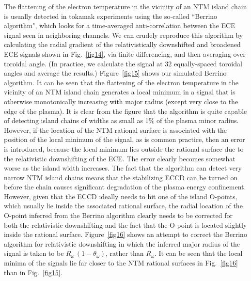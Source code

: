 \documentclass[12pt,prb,aps]{revtex4-1}
\begin{document}
The flattening of the electron temperature in the vicinity of an NTM island chain is usually detected in tokamak experiments using the so-called ``Berrino algorithm", which looks for
a time-averaged anti-correlation between the ECE signal seen in neighboring channels.\cite{ece4}  We can crudely reproduce this algorithm  by calculating the radial gradient of
the relativistically downshifted and broadened ECE signals shown in Fig.~\ref{fig14}, via finite differencing,  and then averaging over toroidal angle. (In practice, we
calculate the signal at 32 equally-spaced toroidal angles and average the results.) Figure~\ref{fig15} shows our simulated Berrino algorithm. It can be seen that the
flattening of the electron temperature in the vicinity of an NTM island chain generates a local minimum in a signal that is otherwise monotonically increasing with major radius (except very close to
the edge of the plasma). It is clear from the figure that the algorithm is quite capable of detecting island chains of widths as small as 1\% of the plasma minor radius. 
However, if the location of the NTM rational surface is associated with the position of the local minimum of the signal, as is common practice,\cite{ece4}  then an error is introduced, because the
local minimum lies outside the rational surface due to the relativistic downshifting of the ECE.  The error clearly becomes somewhat worse as the island width
increases. The fact that the algorithm can detect very narrow NTM island chains means that the stabilizing ECCD can be turned on before the chain causes significant
degradation of the plasma energy confinement. However, given that the ECCD ideally needs to hit one of the island O-points, which usually lie inside the associated rational 
surface, the radial location of the O-point inferred from the Berrino algorithm clearly needs to be corrected for both the relativistic downshifting and the fact that the O-point
is located slightly inside the rational surface. Figure~\ref{fig16} shows an attempt to correct the Berrino algorithm for relativistic downshifting in which the inferred major
radius of the signal is taken to be $R_\omega\,(1-\theta_\omega)$, rather than $R_\omega$. It can be seen that the local minima of the signals lie far closer to
the NTM rational surfaces in Fig.~\ref{fig16} than in Fig.~\ref{fig15}. 
 
\end{document}
